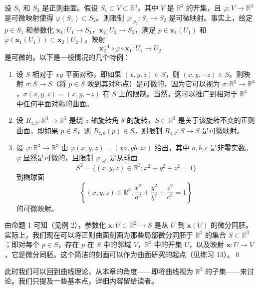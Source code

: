 \begin{Example}[可微映射的限制]\label{ex:restriction-of-differentiable-map}
设 $S_1$ 和 $S_2$ 是正则曲面。假设 $S_1 \subset V \subset \mathbb{R}^3$，其中 $V$ 是 $\mathbb{R}^3$ 的开集，且 $\varphi: V \to \mathbb{R}^3$ 是可微映射使得 $\varphi(S_1) \subset S_2$。则限制 $\varphi|_{S_1}: S_1 \to S_2$ 是可微映射。事实上，给定 $p \in S_1$ 和参数化 $\mathbf{x}_1: U_1 \to S_1$，$\mathbf{x}_2: U_2 \to S_2$，满足 $p \in \mathbf{x}_1(U_1)$ 和 $\varphi(\mathbf{x}_1(U_1)) \subset \mathbf{x}_2(U_2)$，映射
\[
\mathbf{x}_2^{-1} \circ \varphi \circ \mathbf{x}_1: U_1 \to U_2
\]
是可微的。以下是一般情况的几个特例：

\begin{enumerate}
\item 设 $S$ 相对于 $xy$ 平面对称，即如果 $(x,y,z) \in S$，则 $(x,y,-z) \in S$。则映射 $\sigma: S \to S$（将 $p \in S$ 映到其对称点）是可微的，因为它可以视为 $\sigma: \mathbb{R}^3 \to \mathbb{R}^3$，$\sigma(x,y,z) = (x,y,-z)$ 在 $S$ 上的限制。当然，这可以推广到相对于 $\mathbb{R}^3$ 中任何平面对称的曲面。
\item 设 $R_{z,\theta}: \mathbb{R}^3 \to \mathbb{R}^3$ 是绕 $z$ 轴旋转角 $\theta$ 的旋转，$S \subset \mathbb{R}^3$ 是关于该旋转不变的正则曲面，即如果 $p \in S$，则 $R_{z,\theta}(p) \in S$。则限制 $R_{z,\theta}: S \to S$ 是可微映射。
\item 设 $\varphi: \mathbb{R}^3 \to \mathbb{R}^3$ 由 $\varphi(x,y,z) = (xa, yb, zc)$ 给出，其中 $a, b, c$ 是非零实数。$\varphi$ 显然是可微的，且限制 $\varphi|_{S^2}$ 是从球面
\[
S^2 = \{(x,y,z) \in \mathbb{R}^3; x^2 + y^2 + z^2 = 1\}
\]
到椭球面
\[
\left\{(x,y,z) \in \mathbb{R}^3; \frac{x^2}{a^2} + \frac{y^2}{b^2} + \frac{z^2}{c^2} = 1\right\}
\]
的可微映射。
\end{enumerate}
\end{Example}

\begin{Remark}[正则曲面的特征]\label{rem:regular-surface-characterization}
由命题 1 可知（见例 2），参数化 $\mathbf{x}: U \subset \mathbb{R}^2 \to S$ 是从 $U$ 到 $\mathbf{x}(U)$ 的微分同胚。实际上，我们现在可以将正则曲面刻画为那些局部微分同胚于 $\mathbb{R}^2$ 的集合 $S \subset \mathbb{R}^3$；即对每个 $p \in S$，存在 $p$ 在 $S$ 中的邻域 $V$，$\mathbb{R}^2$ 中的开集 $U$，以及映射 $\mathbf{x}: U \to V$，它是微分同胚。这个简洁的刻画可以作为曲面研究的起点（见练习 13）。\qed
\end{Remark}

此时我们可以回到曲线理论，从本章的角度——即将曲线视为 $\mathbb{R}^3$ 的子集——来讨论。我们只提及一些基本点，详细内容留给读者。

